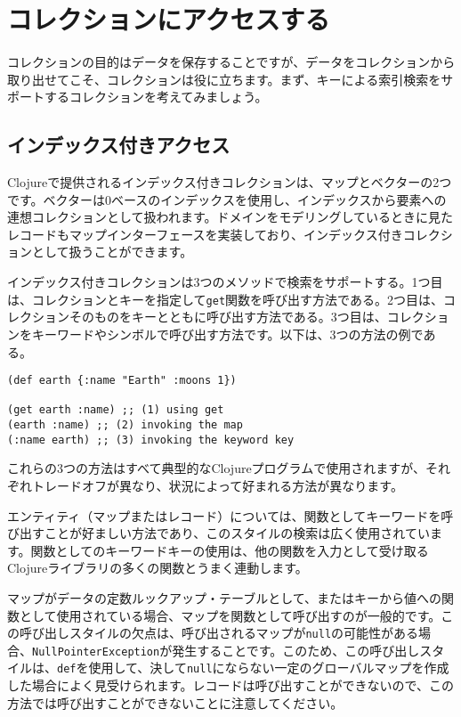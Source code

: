 \section{コレクションにアクセスする}

コレクションの目的はデータを保存することですが、データをコレクションから取り出せてこそ、コレクションは役に立ちます。まず、キーによる索引検索をサポートするコレクションを考えてみましょう。

\subsection{インデックス付きアクセス}

Clojureで提供されるインデックス付きコレクションは、マップとベクターの2つです。ベクターは0ベースのインデックスを使用し、インデックスから要素への連想コレクションとして扱われます。ドメインをモデリングしているときに見たレコードもマップインターフェースを実装しており、インデックス付きコレクションとして扱うことができます。

インデックス付きコレクションは3つのメソッドで検索をサポートする。1つ目は、コレクションとキーを指定して\texttt{get}関数を呼び出す方法である。2つ目は、コレクションそのものをキーとともに呼び出す方法である。3つ目は、コレクションをキーワードやシンボルで呼び出す方法です。以下は、3つの方法の例である。

\begin{lstlisting}[numbers=none]
(def earth {:name "Earth" :moons 1})

(get earth :name) ;; (1) using get
(earth :name) ;; (2) invoking the map
(:name earth) ;; (3) invoking the keyword key
\end{lstlisting}

これらの3つの方法はすべて典型的なClojureプログラムで使用されますが、それぞれトレードオフが異なり、状況によって好まれる方法が異なります。

エンティティ（マップまたはレコード）については、関数としてキーワードを呼び出すことが好ましい方法であり、このスタイルの検索は広く使用されています。関数としてのキーワードキーの使用は、他の関数を入力として受け取るClojureライブラリの多くの関数とうまく連動します。

マップがデータの定数ルックアップ・テーブルとして、またはキーから値への関数として使用されている場合、マップを関数として呼び出すのが一般的です。この呼び出しスタイルの欠点は、呼び出されるマップが\texttt{null}の可能性がある場合、\texttt{NullPointerException}が発生することです。このため、この呼び出しスタイルは、\texttt{def}を使用して、決して\texttt{null}にならない一定のグローバルマップを作成した場合によく見受けられます。レコードは呼び出すことができないので、この方法では呼び出すことができないことに注意してください。

